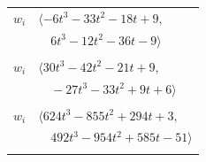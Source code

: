 \documentclass[11pt]{article}
\begin{document}
\begin{longtable}{@{}ll@{}}
$w_i$ & $\langle -6t^{3}-33t^{2}-18t+9,$\\
 & $\quad 6t^{3}-12t^{2}-36t-9\rangle$\\
\addlinespace[2pt]
\multicolumn{2}{@{}p{0.97\textwidth}@{}}{$i=73$, $D_i=3$, $\rho_{ij}$: $15{:}2, \allowbreak 23{:}2, \allowbreak 27{:}2, \allowbreak 36{:}1, \allowbreak 68{:}2, \allowbreak 70{:}1, \allowbreak 74{:}2$}\\
$w_i$ & $\langle 30t^{3}-42t^{2}-21t+9,$\\
 & $\quad -27t^{3}-33t^{2}+9t+6\rangle$\\
\addlinespace[2pt]
\multicolumn{2}{@{}p{0.97\textwidth}@{}}{$i=74$, $D_i=1$, $\rho_{ij}$: $13{:}2, \allowbreak 14{:}2, \allowbreak 17{:}2, \allowbreak 18{:}2, \allowbreak 26{:}1, \allowbreak 29{:}1, \allowbreak 58{:}2, \allowbreak 59{:}1, \allowbreak 66{:}1, \allowbreak 73{:}1$}\\
$w_i$ & $\langle 624t^{3}-855t^{2}+294t+3,$\\
 & $\quad 492t^{3}-954t^{2}+585t-51\rangle$\\
\addlinespace[2pt]
\end{longtable}
\endgroup
\end{document}
